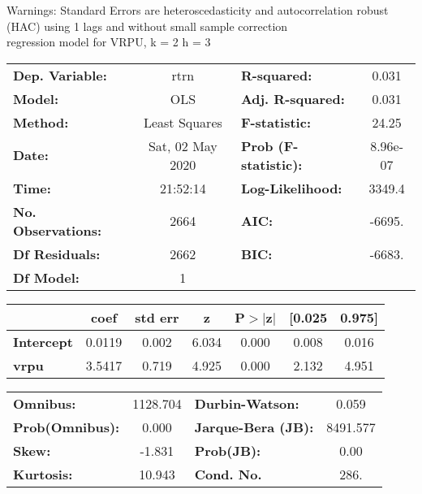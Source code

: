 Warnings: \newline
 [1] Standard Errors are heteroscedasticity and autocorrelation robust (HAC) using 1 lags and without small sample correction\\ 

regression model for VRPU, k = 2 h = 3\begin{center}
\begin{tabular}{lclc}
\toprule
\textbf{Dep. Variable:}    &       rtrn       & \textbf{  R-squared:         } &     0.031   \\
\textbf{Model:}            &       OLS        & \textbf{  Adj. R-squared:    } &     0.031   \\
\textbf{Method:}           &  Least Squares   & \textbf{  F-statistic:       } &     24.25   \\
\textbf{Date:}             & Sat, 02 May 2020 & \textbf{  Prob (F-statistic):} &  8.96e-07   \\
\textbf{Time:}             &     21:52:14     & \textbf{  Log-Likelihood:    } &    3349.4   \\
\textbf{No. Observations:} &        2664      & \textbf{  AIC:               } &    -6695.   \\
\textbf{Df Residuals:}     &        2662      & \textbf{  BIC:               } &    -6683.   \\
\textbf{Df Model:}         &           1      & \textbf{                     } &             \\
\bottomrule
\end{tabular}
\begin{tabular}{lcccccc}
                   & \textbf{coef} & \textbf{std err} & \textbf{z} & \textbf{P$> |$z$|$} & \textbf{[0.025} & \textbf{0.975]}  \\
\midrule
\textbf{Intercept} &       0.0119  &        0.002     &     6.034  &         0.000        &        0.008    &        0.016     \\
\textbf{vrpu}      &       3.5417  &        0.719     &     4.925  &         0.000        &        2.132    &        4.951     \\
\bottomrule
\end{tabular}
\begin{tabular}{lclc}
\textbf{Omnibus:}       & 1128.704 & \textbf{  Durbin-Watson:     } &    0.059  \\
\textbf{Prob(Omnibus):} &   0.000  & \textbf{  Jarque-Bera (JB):  } & 8491.577  \\
\textbf{Skew:}          &  -1.831  & \textbf{  Prob(JB):          } &     0.00  \\
\textbf{Kurtosis:}      &  10.943  & \textbf{  Cond. No.          } &     286.  \\
\bottomrule
\end{tabular}
\end{center}


